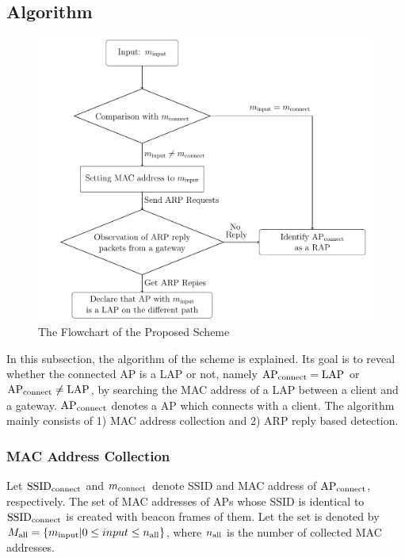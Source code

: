\documentclass[paper]{ieice}
\newcommand{\SSID}{\rm SSID_{connect}}
\newcommand{\tarAP}{\rm AP_{connect}}
\newcommand{\tarMAC}{m_{\rm connect}}
\begin{document}
\subsection{Algorithm} \label{sec:alg}
\begin{figure}[t]
    \begin{center}
        \includegraphics[scale=0.43]{flowchart/flowchart.pdf}
        \caption{The Flowchart of the Proposed Scheme}
        \label{fig:flowchart}
    \end{center}
\vspace{-2zh}
\end{figure}
In this subsection, the algorithm of the scheme is explained.
Its goal is to reveal whether the connected AP is a LAP or not, namely $\tarAP = LAP$ or $\tarAP \ne LAP$, by searching the MAC address of a LAP between a client and a gateway.
$\tarAP$ denotes a AP which connects with a client.
The algorithm mainly consists of 1) MAC address collection and 2) ARP reply based detection.

\subsubsection{MAC Address Collection}
Let $\SSID$ and $\tarMAC$ denote SSID and MAC address of $\tarAP$, respectively.
The set of MAC addresses of APs whose SSID is identical to $\SSID$  is created with beacon frames of them.
Let the set is denoted by $M_{\rm all}=\{m_{\rm i nput}|0\le input \le n_{\rm al l}  \}$, where $n_{\rm all}$ is the number of collected MAC addresses.
\end{document}
